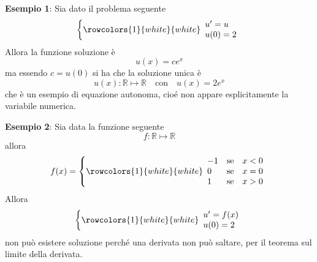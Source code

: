 \documentclass[a4paper]{extarticle}
\begin{document}
\vspace{2em}
\noindent
\textbf{Esempio 1}: Sia dato il problema seguente
\[
    \left\{
        \rowcolors{1}{white}{white}
        \begin{array}{l}
            u'=u\\
            u(0)=2
        \end{array}
    \right.
\]
Allora la funzione soluzione è
\[u(x)=ce^x\]
ma essendo $c=u(0)$ si ha che la soluzione unica è
\[u(x) : \mathbb{R} \longmapsto \mathbb{R} \hspace{1em} \text{con} \hspace{1em} u(x)=2e^x\]
che è un esempio di equazione autonoma, cioé non appare esplicitamente la variabile numerica.

\vspace{2em}
\noindent
\textbf{Esempio 2}: Sia data la funzione seguente
\[f : \mathbb{R} \longmapsto \mathbb{R}\]
allora
\[
    f(x) =
    \left\{
        \rowcolors{1}{white}{white}
        \begin{array}{lll}
            -1 & \text{se} & x<0\\
            0  & \text{se} & x=0\\
            1  & \text{se} & x>0 
        \end{array}
    \right.
\]
Allora
\[
    \left\{
        \rowcolors{1}{white}{white}
        \begin{array}{lll}
            u'=f(x)\\
            u(0)=2
        \end{array}
    \right.
\]
non può esistere soluzione perché una derivata non può saltare, per il teorema sul limite della derivata.
\end{document}
